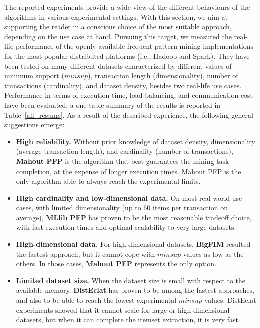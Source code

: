 

The reported experiments provide a wide view of the different behaviours of the
algorithms in various experimental settings.
With this section, we aim at supporting the reader
in a conscious choice of the most suitable approach,
depending on the use case at hand.
Pursuing this target, we measured the real-life performance
of the openly-available frequent-pattern mining implementations
for the most popular distributed platforms (i.e., Hadoop and Spark).
They have been tested on many different datasets
characterized by different values of
minimum support ($minsup$),
transaction length (dimensionality),
number of transactions (cardinality),
and dataset density,
besides two real-life use cases.
Performance in terms of execution time, load balancing, and communication cost
have been evaluated:
a one-table summary of the results is reported in Table~\ref{all_resume}.
As a result of the described experience,
the following general suggestions emerge:

\begin{itemize}
 \item {\bf High reliability.}
 Without prior knowledge of dataset density, dimensionality
 (average transaction length), and cardinality (number of transactions),
 \textbf{Mahout PFP} is the algorithm that best guarantees
 the mining task completion,
 at the expense of longer execution times.
 Mahout PFP is the only algorithm able to always reach the experimental limits.


 \item {\bf High cardinality and low-dimensional data.}
 On most real-world use cases, with limited dimensionality
 (up to 60 items per transaction on average), \textbf{MLlib PFP}
 has proven to be the most reasonable tradeoff choice,
 with fast execution times and optimal scalability to very large datasets.

 \item {\bf High-dimensional data.}
 For high-dimensional datasets, \textbf{BigFIM} resulted
 the fastest approach, but it cannot cope with $minsup$ values as low as the others. In those cases, \textbf{Mahout PFP} represents the only option.

 \item {\bf Limited dataset size.}
 When the dataset size is small with respect to the available memory,
 \textbf{DistEclat} has proven to be among the fastest approaches,
 and also to be able to reach the lowest experimental $minsup$ values.
 DistEclat experiments showed that it cannot scale for large or
 high-dimensional datasets, but when it can complete the itemset extraction,
 it is very fast.

\end{itemize}

